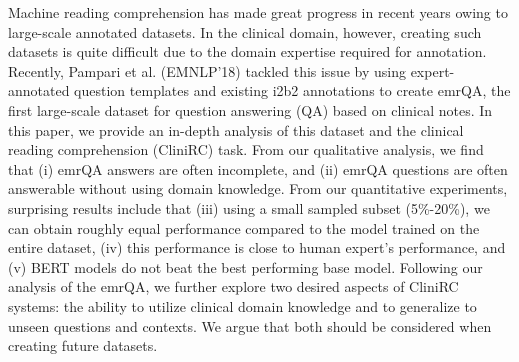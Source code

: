 Machine reading comprehension has made great progress in recent years owing to large-scale annotated datasets. In the clinical domain, however, creating such datasets is quite difficult due to the domain expertise required for annotation. Recently, Pampari et al. (EMNLP'18) tackled this issue by using expert-annotated question templates and existing i2b2 annotations to create emrQA, the first large-scale dataset for question answering (QA) based on clinical notes. In this paper, we provide an in-depth analysis of this dataset and the clinical reading comprehension (CliniRC) task. From our qualitative analysis, we find that (i) emrQA answers are often incomplete, and (ii) emrQA questions are often answerable without using domain knowledge. From our quantitative experiments, surprising results include that (iii) using a small sampled subset (5\%-20\%), we can obtain roughly equal performance compared to the model trained on the entire dataset, (iv) this performance is close to human expert's performance, and (v) BERT models do not beat the best performing base model. Following our analysis of the emrQA, we further explore two desired aspects of CliniRC systems: the ability to utilize clinical domain knowledge and to generalize to unseen questions and contexts. We argue that both should be considered when creating future datasets.
